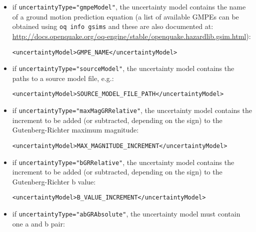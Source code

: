 \begin{itemize}

    \item if \Verb+uncertaintyType="gmpeModel"+, the uncertainty model
	contains the name of a ground motion prediction equation (a list of
	available GMPEs can be obtained using \texttt{oq info gsims} and these
        are also documented at:
	\href{http://docs.openquake.org/oq-engine/stable/openquake.hazardlib.gsim.html}{http://docs.openquake.org/oq-engine/stable/openquake.hazardlib.gsim.html}):

    \begin{verbatim}
<uncertaintyModel>GMPE_NAME</uncertaintyModel>
	\end{verbatim}

    \item if \Verb+uncertaintyType="sourceModel"+, the uncertainty model
	contains the paths to a source model file, e.g.:

    \begin{verbatim}
<uncertaintyModel>SOURCE_MODEL_FILE_PATH</uncertaintyModel>
	\end{verbatim}

    \item if \Verb+uncertaintyType="maxMagGRRelative"+, the uncertainty model
	contains the increment to be added (or subtracted, depending on the sign)
	to the Gutenberg-Richter maximum magnitude:

    \begin{verbatim}
<uncertaintyModel>MAX_MAGNITUDE_INCREMENT</uncertaintyModel>
	\end{verbatim}

    \item if \Verb+uncertaintyType="bGRRelative"+, the uncertainty model
	contains the increment to be added (or subtracted, depending on the sign)
	to the Gutenberg-Richter b value:

    \begin{verbatim}
<uncertaintyModel>B_VALUE_INCREMENT</uncertaintyModel>
	\end{verbatim}

    \item if \Verb+uncertaintyType="abGRAbsolute"+, the uncertainty model
	must contain one a and b pair:


\end{itemize}
